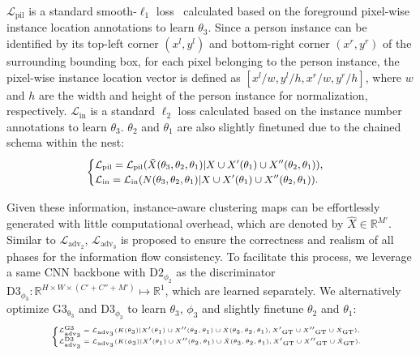 \documentclass[10pt,twocolumn,letterpaper]{article}
\theoremstyle{definition}
\theoremstyle{remark}
\begin{document}
$\mathcal{L}_{\mathrm{pil}}$ is a standard smooth-$\ell_1$ loss~\cite{girshick2015fast} calculated based on the foreground pixel-wise instance location annotations to learn $\theta_3$. Since a person instance can be identified by its top-left corner $(x^l, y^l)$ and bottom-right corner $(x^r, y^r)$ of the surrounding bounding box, for each pixel belonging to the person instance, the pixel-wise instance location vector is defined as $[x^l/w, y^l/h, x^r/w, y^r/h]$, where $w$ and $h$ are the width and height of the person instance for normalization, respectively. $\mathcal{L}_{\mathrm{in}}$ is a standard $\ell_2$ loss calculated based on the instance number annotations to learn $\theta_3$. $\theta_2$ and $\theta_1$ are also slightly finetuned due to the chained schema within the nest:
\begin{equation}
\small
\begin{cases}
\mathcal{L}_{\mathrm{pil}} = \mathcal{L}_{\mathrm{pil}}(\tilde{X}(\theta_3, \theta_2, \theta_1)|X \cup X{'}(\theta_1) \cup X{''}(\theta_2, \theta_1)), \\
\mathcal{L}_{\mathrm{in}} = \mathcal{L}_{\mathrm{in}}(N(\theta_3, \theta_2, \theta_1)|X \cup X{'}(\theta_1) \cup X{''}(\theta_2, \theta_1)).
\end{cases}
\end{equation}

Given these information, instance-aware clustering maps can be effortlessly generated with little computational overhead, which are denoted by $\hat{X}\in \mathbb{R}^{M{'}}$. Similar to $\mathcal{L}_{\mathrm{adv}_2}$, $\mathcal{L}_{\mathrm{adv}_3}$ is proposed to ensure the correctness and realism of all phases for the information flow consistency. To facilitate this process, we leverage a same CNN backbone with $\mathrm{D2}_{\phi_2}$ as the discriminator $\mathrm{D3}_{\phi_3}: \mathbb{R}^{H \times W \times (C{'}+C{''}+M{'})} \mapsto \mathbb{R}^{1}$, which are learned separately. We alternatively optimize $\mathrm{G3_{\theta_3}}$ and $\mathrm{D3}_{\phi_3}$ to learn $\theta_3$, $\phi_3$ and slightly finetune $\theta_2$ and $\theta_1$:
\begin{equation}
\tiny
\begin{cases}
\mathcal{L}_{\mathrm{adv}_3}^{\mathrm{G3}} = \mathcal{L}_{\mathrm{adv}_3}(K(\theta_3)|X{'}(\theta_1) \cup X{''}(\theta_2, \theta_1) \cup \hat{X}(\theta_3, \theta_2, \theta_1), X{'}_{\mathrm{GT}} \cup X{''}_{\mathrm{GT}} \cup \hat{X}_{\mathrm{GT}}), \\
\mathcal{L}_{\mathrm{adv}_3}^{\mathrm{D3}} = \mathcal{L}_{\mathrm{adv}_3}(K(\phi_3)|X{'}(\theta_1) \cup X{''}(\theta_2, \theta_1) \cup \hat{X}(\theta_3, \theta_2, \theta_1), X{'}_{\mathrm{GT}} \cup X{''}_{\mathrm{GT}} \cup \hat{X}_{\mathrm{GT}}).
\end{cases}
\end{equation}
\end{document}
